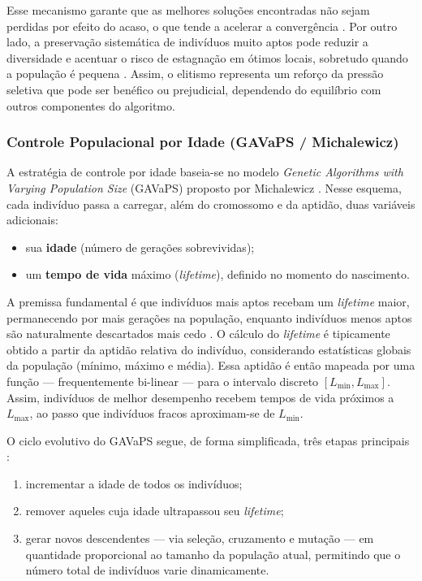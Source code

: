 Esse mecanismo garante que as melhores soluções encontradas não sejam perdidas por efeito do acaso, o que tende a acelerar a convergência \cite{dejong1975analysis,goldberg1989genetic}. Por outro lado, a preservação sistemática de indivíduos muito aptos pode reduzir a diversidade e acentuar o risco de estagnação em ótimos locais, sobretudo quando a população é pequena \cite{eiben2015introduction,lacerda1999introducao}. Assim, o elitismo representa um reforço da pressão seletiva que pode ser benéfico ou prejudicial, dependendo do equilíbrio com outros componentes do algoritmo.

\subsubsection{Controle Populacional por Idade (GAVaPS / Michalewicz)}

A estratégia de controle por idade baseia-se no modelo \textit{Genetic Algorithms with Varying Population Size} (GAVaPS) proposto por Michalewicz \cite{michalewicz1993genetic}. Nesse esquema, cada indivíduo passa a carregar, além do cromossomo e da aptidão, duas variáveis adicionais:

\begin{itemize}
\item sua \textbf{idade} (número de gerações sobrevividas);
\item um \textbf{tempo de vida} máximo (\textit{lifetime}), definido no momento do nascimento.
\end{itemize}

A premissa fundamental é que indivíduos mais aptos recebam um \textit{lifetime} maior, permanecendo por mais gerações na população, enquanto indivíduos menos aptos são naturalmente descartados mais cedo \cite{michalewicz1993genetic}. O cálculo do \textit{lifetime} é tipicamente obtido a partir da aptidão relativa do indivíduo, considerando estatísticas globais da população (mínimo, máximo e média). Essa aptidão é então mapeada por uma função — frequentemente bi-linear — para o intervalo discreto $[L_{\min}, L_{\max}]$. Assim, indivíduos de melhor desempenho recebem tempos de vida próximos a $L_{\max}$, ao passo que indivíduos fracos aproximam-se de $L_{\min}$.

O ciclo evolutivo do GAVaPS segue, de forma simplificada, três etapas principais \cite{michalewicz1993genetic,eiben2015introduction}:

\begin{enumerate}
\item incrementar a idade de todos os indivíduos;
\item remover aqueles cuja idade ultrapassou seu \textit{lifetime};
\item gerar novos descendentes — via seleção, cruzamento e mutação — em quantidade proporcional ao tamanho da população atual, permitindo que o número total de indivíduos varie dinamicamente.
\end{enumerate}

